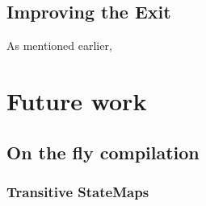 \subsection{Improving the Exit}
As mentioned earlier, 

\section{Future work}
\subsection{On the fly compilation}
\subsubsection{Transitive StateMaps}

